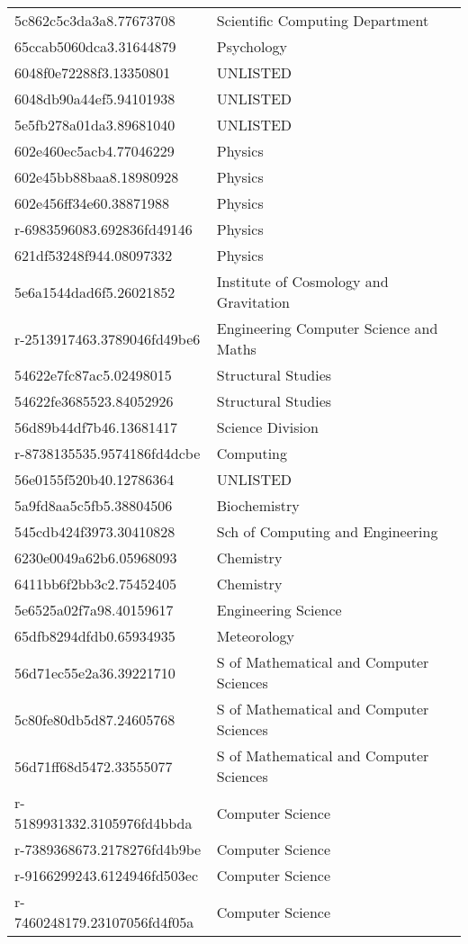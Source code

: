 \begin{tabular}{ll}
5c862c5c3da3a8.77673708 & Scientific Computing Department \\
65ccab5060dca3.31644879 & Psychology \\
6048f0e72288f3.13350801 & UNLISTED \\
6048db90a44ef5.94101938 & UNLISTED \\
5e5fb278a01da3.89681040 & UNLISTED \\
602e460ec5acb4.77046229 & Physics \\
602e45bb88baa8.18980928 & Physics \\
602e456ff34e60.38871988 & Physics \\
r-6983596083.692836fd49146 & Physics \\
621df53248f944.08097332 & Physics \\
5e6a1544dad6f5.26021852 & Institute of Cosmology and Gravitation \\
r-2513917463.3789046fd49be6 & Engineering Computer Science and Maths \\
54622e7fc87ac5.02498015 & Structural Studies \\
54622fe3685523.84052926 & Structural Studies \\
56d89b44df7b46.13681417 & Science Division \\
r-8738135535.9574186fd4dcbe & Computing \\
56e0155f520b40.12786364 & UNLISTED \\
5a9fd8aa5c5fb5.38804506 & Biochemistry \\
545cdb424f3973.30410828 & Sch of Computing and Engineering \\
6230e0049a62b6.05968093 & Chemistry \\
6411bb6f2bb3c2.75452405 & Chemistry \\
5e6525a02f7a98.40159617 & Engineering Science \\
65dfb8294dfdb0.65934935 & Meteorology \\
56d71ec55e2a36.39221710 & S of Mathematical and Computer Sciences \\
5c80fe80db5d87.24605768 & S of Mathematical and Computer Sciences \\
56d71ff68d5472.33555077 & S of Mathematical and Computer Sciences \\
r-5189931332.3105976fd4bbda & Computer Science \\
r-7389368673.2178276fd4b9be & Computer Science \\
r-9166299243.6124946fd503ec & Computer Science \\
r-7460248179.23107056fd4f05a & Computer Science \\

\end{tabular}
